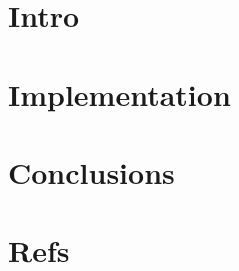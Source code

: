 \section[Intro]{Intro}


% 

% 

\section[Impl]{Implementation}
% 



\section[Con]{Conclusions}



\section[End]{Refs}

